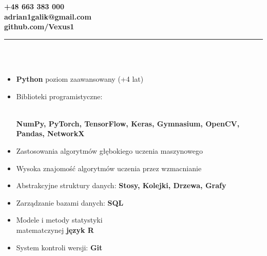 \documentclass[10pt]{article}
\begin{document}
\begin{paracol}{2}
\begin{leftcolumn}
    \vspace*{-2ex} %
    \noindent \textbf{+48 663 383 000 \\
    adrian1galik@gmail.com \\
    github.com/Vexus1} \\
    \rule{6cm}{1pt} \\ \\
    \fontsize{10pt}{10pt}
    \begin{itemize}[leftmargin=*]
        \setlength{\parskip}{0pt}
        \item \textbf{Python} poziom zaawansowany (+4 lat)
        \item Biblioteki programistyczne: \raggedright \\ \textbf{NumPy, PyTorch, TensorFlow, Keras, Gymnasium, OpenCV, Pandas, NetworkX}
        \item Zastosowania algorytmów głębokiego uczenia maszynowego
        \item Wysoka znajomość algorytmów uczenia przez wzmacnianie
        \item Abstrakcyjne struktury danych: \textbf{Stosy, Kolejki, Drzewa, Grafy}
        \item Zarządzanie bazami danych: \textbf{SQL}
        \item Modele i metody statystyki \\ matematczynej \textbf{język R}
        \item System kontroli wersji: \textbf{Git}

\end{itemize}
\end{leftcolumn}
\end{paracol}
\end{document}
